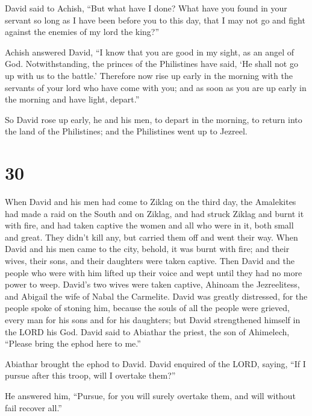  David said to Achish, ``But what have I done? What have
you found in your servant so long as I have been before you to this day,
that I may not go and fight against the enemies of my lord the king?''

 Achish answered David, ``I know that you are good in my
sight, as an angel of God. Notwithstanding, the princes of the
Philistines have said, `He shall not go up with us to the battle.'
 Therefore now rise up early in the morning with the
servants of your lord who have come with you; and as soon as you are up
early in the morning and have light, depart.''

 So David rose up early, he and his men, to depart in the
morning, to return into the land of the Philistines; and the Philistines
went up to Jezreel.

\hypertarget{section-29}{%
\section{30}\label{section-29}}

 When David and his men had come to Ziklag on the third
day, the Amalekites had made a raid on the South and on Ziklag, and had
struck Ziklag and burnt it with fire,  and had taken
captive the women and all who were in it, both small and great. They
didn't kill any, but carried them off and went their way. 
When David and his men came to the city, behold, it was burnt with fire;
and their wives, their sons, and their daughters were taken captive.
 Then David and the people who were with him lifted up
their voice and wept until they had no more power to weep.
 David's two wives were taken captive, Ahinoam the
Jezreelitess, and Abigail the wife of Nabal the Carmelite.
 David was greatly distressed, for the people spoke of
stoning him, because the souls of all the people were grieved, every man
for his sons and for his daughters; but David strengthened himself in
the LORD his God.  David said to Abiathar the priest, the
son of Ahimelech, ``Please bring the ephod here to me.''

Abiathar brought the ephod to David.  David enquired of
the LORD, saying, ``If I pursue after this troop, will I overtake
them?''

He answered him, ``Pursue, for you will surely overtake them, and will
without fail recover all.''

